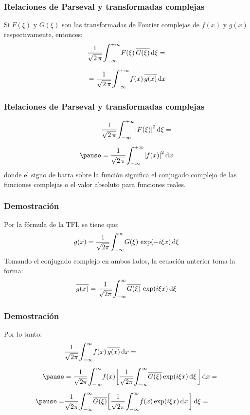 \begin{frame}
\frametitle{Relaciones de Parseval y transformadas complejas}
Si $F (\xi)$ y $G (\xi)$ son las transformadas de Fourier complejas de $f (x)$ y $g (x)$ respectivamente, entonces:
\pause
\begin{eqnarray}
\begin{aligned}[b]
&\dfrac{1}{\sqrt{2 \, \pi}} \scaleint{6ex}_{\bs -\infty}^{+\infty} F (\xi) \, \overline{G (\xi)} \dd{\xi} = \\[0.5em]
&=\dfrac{1}{\sqrt{2 \, \pi}} \scaleint{6ex}_{\bs -\infty}^{+\infty} f (x) \, \overline{g (x)} \dd{x}
\end{aligned}
\label{eq:ecuacion_01_30}
\end{eqnarray}
\end{frame}
\begin{frame}
\frametitle{Relaciones de Parseval y transformadas complejas}
\begin{eqnarray}
\begin{aligned}[b]
&\dfrac{1}{\sqrt{2 \, \pi}} \scaleint{6ex}_{\bs -\infty}^{+\infty} \abs{F (\xi)}^{2} \dd{\xi} = \\[0.5em] \pause
&= \dfrac{1}{\sqrt{2 \, \pi}} \scaleint{6ex}_{\bs -\infty}^{+\infty} \abs{f (x)}^{2} \dd{x}
\end{aligned}
\label{eq:ecuacion_01_31}
\end{eqnarray}
donde el signo de barra sobre la función significa el conjugado complejo de las funciones complejas o el valor absoluto para funciones reales.
\end{frame}
\begin{frame}
\frametitle{Demostración}
Por la fórmula de la TFI, se tiene que:
\pause
\begin{align*}
g (x) = \dfrac{1}{\sqrt{2 \pi}} \scaleint{6ex}_{\bs -\infty}^{\infty} G (\xi) \, \exp(-i \xi x) \dd{\xi}
\end{align*}
\pause
Tomando el conjugado complejo en ambos lados, la ecuación anterior toma la forma:
\begin{align*}
\overline{g (x)} = \dfrac{1}{\sqrt{2 \pi}} \scaleint{6ex}_{\bs -\infty}^{\infty} \overline{G (\xi)} \, \exp(i \xi x) \dd{\xi}
\end{align*}
\end{frame}
\begin{frame}
\frametitle{Demostración}
Por lo tanto:
\pause
\begin{eqnarray*}
\begin{aligned}
&\dfrac{1}{\sqrt{2 \pi}} \scaleint{6ex}_{\bs -\infty}^{\infty} f (x) \, \overline{g (x)} \dd{x} = \\[0.5em] \pause
&=\dfrac{1}{\sqrt{2 \pi}} \scaleint{6ex}_{\bs -\infty}^{\infty} f (x) \bigg[ \dfrac{1}{\sqrt{2 \pi}} \scaleint{6ex}_{\bs -\infty}^{\infty} \overline{G (\xi)} \exp(i \xi x) \dd{\xi} \bigg] \dd{x} = \\[0.5em] \pause
=& \dfrac{1}{\sqrt{2 \pi}} \scaleint{6ex}_{\bs -\infty}^{\infty} \overline{G (\xi)} \bigg[ \dfrac{1}{\sqrt{2 \pi}} \scaleint{6ex}_{\bs -\infty}^{\infty} f (x) \exp(i \xi x) \dd{x} \bigg] \dd{\xi} = 
\end{aligned}
\end{eqnarray*}
\end{frame}
